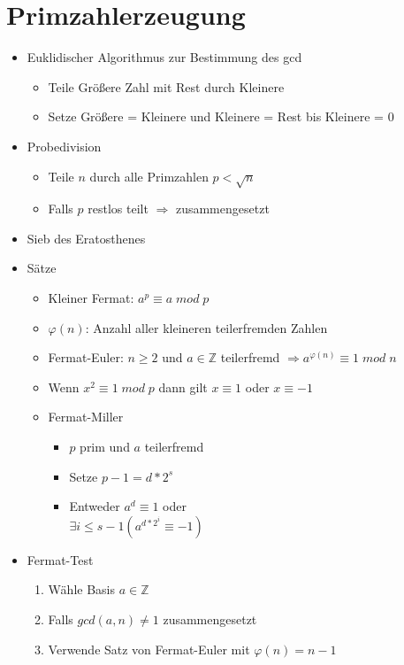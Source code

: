 \documentclass[11pt, paper=a4, twocolumn]{scrartcl}
\newcommand*{\Z}{\mathbb{Z}}
\begin{document}
	\section{Primzahlerzeugung}
		\begin{itemize}
			\item Euklidischer Algorithmus zur Bestimmung des gcd
				\begin{itemize}
					\item Teile Größere Zahl mit Rest durch Kleinere
					\item Setze Größere = Kleinere und Kleinere = Rest bis Kleinere = 0
				\end{itemize}
			\item Probedivision
				\begin{itemize}
					\item Teile $n$ durch alle Primzahlen $p<\sqrt{n}$
					\item Falls $p$ restlos teilt $\Rightarrow$ zusammengesetzt
				\end{itemize}
			\item Sieb des Eratosthenes
			\item Sätze
				\begin{itemize}
					\item  Kleiner Fermat: $a^p\equiv a\;mod\;p$
					\item $\varphi(n)$: Anzahl aller kleineren teilerfremden Zahlen
					\item Fermat-Euler: $n\geq2$ und $a\in\Z$ teilerfremd $\Rightarrow a^{\varphi(n)}\equiv1\;mod\;n$
					\item Wenn $x^2\equiv1\;mod\;p$ dann gilt $x\equiv1$ oder $x\equiv-1$
					\item Fermat-Miller
						\begin{itemize}
							\item $p$ prim und $a$ teilerfremd
							\item Setze $p-1=d*2^s$
							\item Entweder $a^d\equiv1$ oder\\
								$\exists i\leq s-1(a^{d*2^i}\equiv-1)$ 
						\end{itemize}
				\end{itemize}
			\item Fermat-Test
				\begin{enumerate}
					\item Wähle Basis $a\in\Z$
					\item Falls $gcd(a,n)\neq1$ zusammengesetzt
					\item Verwende Satz von Fermat-Euler mit $\varphi(n)=n-1$

\end{enumerate}
\end{itemize}
\end{document}
